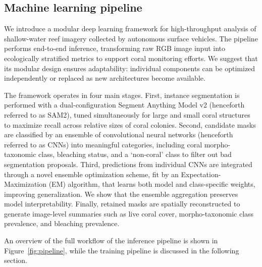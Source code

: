 \documentclass[11pt]{elsarticle}
\begin{document}
\subsection{Machine learning pipeline}

We introduce a modular deep learning framework for high-throughput analysis of shallow-water reef imagery collected by autonomous surface vehicles. The pipeline performs end-to-end inference, transforming raw RGB image input into ecologically stratified metrics to support coral monitoring efforts. We suggest that its modular design ensures adaptability: individual components can be optimized independently or replaced as new architectures become available.

The framework operates in four main stages. First, instance segmentation is performed with a dual-configuration Segment Anything Model v2 (henceforth referred to as SAM2), tuned simultaneously for large and small coral structures to maximize recall across relative sizes of coral colonies. Second, candidate masks are classified by an ensemble of convolutional neural networks (henceforth referred to as CNNs) into meaningful categories, including coral morpho-taxonomic class, bleaching status, and a `non-coral' class to filter out bad segmentation proposals. Third, predictions from individual CNNs are integrated through a novel ensemble optimization scheme, fit by an Expectation-Maximization (EM) algorithm, that learns both model and class-specific weights, improving generalization. We show that the ensemble aggregation preserves model interpretability. Finally, retained masks are spatially reconstructed to generate image-level summaries such as live coral cover, morpho-taxonomic class prevalence, and bleaching prevalence.

An overview of the full workflow of the inference pipeline is shown in Figure~\ref{fig:pipeline}, while the training pipeline is discussed in the following section.
\end{document}

